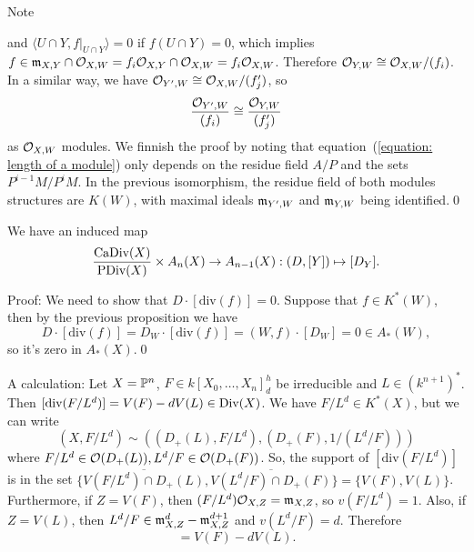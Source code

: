 Note 
\begin{center}
\end{center}
and $\langle U\cap Y, f|_{U\cap Y}\rangle = 0$ if $f(U\cap Y)=0$, which implies 
$f\in\mathfrak{m}_{X,Y}\cap \mathcal{O}_{X,W} = f_i\mathcal{O}_{X,Y}\cap\mathcal{O}_{X,W} = f_i\mathcal{O}_{X,W}$. Therefore 
$\mathcal{O}_{Y,W} \cong \mathcal{O}_{X,W}/(f_i)$. In a similar way, we have 
$\mathcal{O}_{Y^\prime, W} \cong \mathcal{O}_{X,W}/(f_j^\prime)$, so 
\begin{equation}
    \frac{\mathcal{O}_{Y^\prime, W}}{(f_i)} \cong \frac{\mathcal{O}_{Y,W}}{(f_j^\prime)}
\end{equation}
as $\mathcal{O}_{X,W}$ modules. 
We finnish the proof by noting that equation~(\ref{equation: length of a module}) only depends on the residue 
field $A/P$ and the sets $P^{i-1}M/P^iM$. In the previous isomorphism, the residue field of both modules 
structures are $K(W)$, with maximal ideals $\mathfrak{m}_{Y^\prime, W}$ and $\mathfrak{m}_{Y,W}$ being identified.\qed

\begin{dang}
    \begin{corollary}
        We have an induced map 
        \begin{equation}
            \frac{\text{CaDiv}(X)}{\text{PDiv}(X)}\times A_n(X)\to A_{n-1}(X): (D, [Y])\mapsto [D_Y].
        \end{equation}
    \end{corollary}
\end{dang}
Proof: We need to show that $D\cdot [\text{div}(f)] = 0$. Suppose that $f\in K^*(W)$, then by the previous proposition 
we have 
\begin{equation}
    D\cdot[\text{div}(f)] = D_W\cdot[\text{div}(f)] = (W,f)\cdot [D_W] = 0 \in A_*(W),
\end{equation} 
so it's zero in $A_*(X)$.\qed



\begin{example}
    A calculation: Let $X=\mathbb{P}^n$, $F\in k[X_0,\dots, X_n]_d^h$ be irreducible and $L\in (k^{n+1})^*$. Then 
    $[\text{div}(F/L^d)]=V(F) - d V(L)\in\text{Div}(X)$. We have $F/L^d\in K^*(X)$, but we can write 
    \begin{equation}
        (X, F/L^d)\sim ((D_+(L), F/L^d), (D_+(F), 1/ (L^d/F)))
    \end{equation}
    where $F/L^d\in\mathcal{O}(D_+(L)), L^d/F\in\mathcal{O}(D_+(F))$. So, the support of 
    $[\text{div}(F/L^d)]$ is in the set $\{\overline{V(F/L^d)\cap D_+(L)},\overline{V(L^d/F)\cap D_+(F)}\}=\{V(F),V(L)\}$.
    Furthermore, if $Z=V(F)$, then $(F/L^d)\mathcal{O}_{X,Z}=\mathfrak{m}_{X,Z}$, so $v(F/L^d)=1$. Also, if 
    $Z=V(L)$, then $L^d/F \in\mathfrak{m}_{X,Z}^d-\mathfrak{m}_{X,Z}^{d+1}$ and $v(L^d/F) = d$. Therefore 
    \begin{equation}
        [\text{div}(F/L^d)]=V(F) - d V(L).
    \end{equation}
\end{example}

